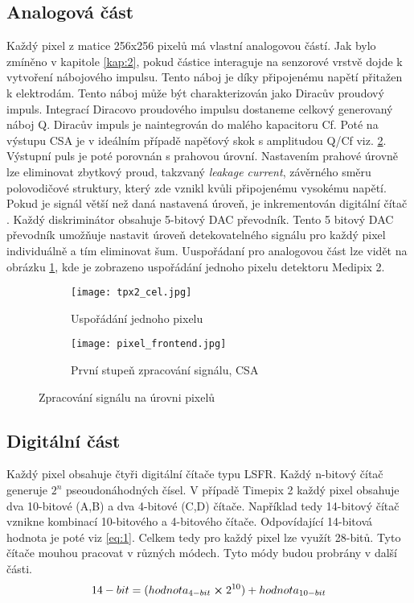 \subsection{Analogová část}	 %
Každý pixel z matice 256x256 pixelů má vlastní analogovou částí. Jak bylo zmíněno v kapitole \ref{kap:2}, pokud částice interaguje na senzorové vrstvě dojde k vytvoření nábojového impulsu. Tento náboj je díky připojenému napětí přitažen k elektrodám. Tento náboj může být charakterizován jako Diracův proudový impuls. Integrací Diracovo proudového impulsu dostaneme celkový generovaný náboj Q. Diracův impuls je naintegrován do malého kapacitoru Cf. Poté na výstupu CSA je v ideálním případě napěťový skok s amplitudou Q/Cf viz. \ref{fig:pixel_frontend}. Výstupní puls je poté porovnán s prahovou úrovní. Nastavením prahové úrovně lze eliminovat zbytkový proud, takzvaný \textit{leakage current}, závěrného směru polovodičové struktury, který zde vznikl kvůli připojenému vysokému napětí. Pokud je signál větší než daná nastavená úroveň, je inkrementován digitální čítač \cite{Llopart}. Každý diskriminátor obsahuje 5-bitový DAC převodník. Tento 5 bitový DAC převodník umožňuje nastavit úroveň detekovatelného signálu pro každý pixel individuálně a tím eliminovat šum. Uuspořádaní pro analogovou část lze vidět na obrázku \ref{fig:tpx2_cel}, kde je zobrazeno uspořádání jednoho pixelu detektoru Medipix 2.
\begin{figure}[h!]
	\begin{subfigure}{0.5\textwidth}
	\centering
	\captionsetup{justification=centering}
	\texttt{[image: tpx2\_cel.jpg]}
	\caption{Uspořádání jednoho pixelu} 
	\label{fig:tpx2_cel}
	\end{subfigure}
	\begin{subfigure}{0.5\textwidth}
		\centering
		\texttt{[image: pixel\_frontend.jpg]}
		\caption{První stupeň zpracování signálu, CSA}
		\label{fig:pixel_frontend}
	\end{subfigure}
	\caption{Zpracování signálu na úrovni pixelů}
	\label{fig:zpracování signálu}
\end{figure}

\subsection{Digitální část}
Každý pixel obsahuje čtyři digitální čítače typu LSFR. Každý n-bitový čítač generuje $2^n$ pseoudonáhodných čísel. V případě Timepix 2 každý pixel obsahuje dva 10-bitové (A,B) a dva 4-bitové (C,D) čítače. Například tedy 14-bitový čítač vznikne kombinací 10-bitového a 4-bitového čítače. Odpovídající 14-bitová hodnota je poté viz \ref{eq:1}. Celkem tedy pro každý pixel lze využít 28-bitů. Tyto čítače mouhou pracovat v různých módech. Tyto módy budou probrány v další části.
\begin{equation}
	14-bit = (hodnota_{4-bit} \cross 2^{10}) + hodnota_{10-bit}
	\label{eq:1}
\end{equation}

